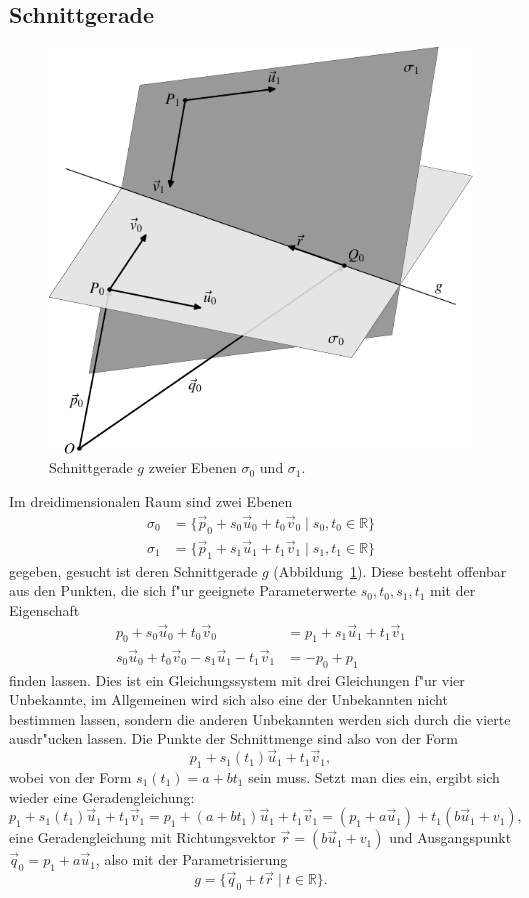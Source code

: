 \subsection{Schnittgerade}
\begin{figure}
\begin{center}
\includegraphics{images/v-10}
\end{center}
\caption{Schnittgerade $g$ zweier Ebenen $\sigma_0$ und $\sigma_1$.
\label{image-schnittgerade}}
\end{figure}
Im dreidimensionalen Raum sind zwei Ebenen
\begin{align*}
\sigma_0&=
\{\vec p_0+s_0\vec u_0+t_0\vec v_0\;|\;s_0, t_0\in\mathbb R\}
\\
\sigma_1&=
\{\vec p_1+s_1\vec u_1+t_1\vec v_1\;|\;s_1, t_1\in\mathbb R\}
\end{align*}
gegeben, gesucht ist deren Schnittgerade $g$
(Abbildung~\ref{image-schnittgerade}). Diese besteht offenbar aus
den Punkten, die sich f"ur geeignete Parameterwerte $s_0,t_0,s_1,t_1$
mit der Eigenschaft
\begin{align*}
p_0+s_0\vec u_0+t_0\vec v_0
&=
p_1+s_1\vec u_1+t_1\vec v_1
\\
s_0\vec u_0+t_0\vec v_0
-s_1\vec u_1-t_1\vec v_1
&=
-p_0+
p_1
\end{align*}
finden lassen. Dies ist ein Gleichungssystem mit drei Gleichungen f"ur
vier Unbekannte, im Allgemeinen wird sich also eine der Unbekannten
nicht bestimmen lassen, sondern die anderen Unbekannten werden sich
durch die vierte ausdr"ucken lassen. Die Punkte der Schnittmenge sind
also von der Form
\[
p_1+s_1(t_1)\vec u_1+t_1\vec v_1,
\]
wobei von der Form $s_1(t_1)=a+bt_1$ sein muss. Setzt man dies ein,
ergibt sich wieder eine Geradengleichung:
\[
p_1+s_1(t_1)\vec u_1+t_1\vec v_1
=
p_1+(a+bt_1)\vec u_1+t_1\vec v_1
=
(p_1+a\vec u_1)+t_1(b\vec u_1+v_1),
\]
eine Geradengleichung mit Richtungsvektor $\vec r = (b\vec u_1+v_1)$ und
Ausgangspunkt $\vec q_0=p_1+a\vec u_1$, also mit der Parametrisierung
\[
g=\{\vec q_0+t\vec r\;|\;t\in\mathbb R\}.
\]

